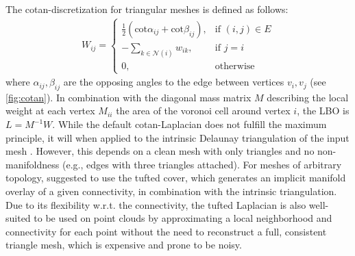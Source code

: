 The cotan-discretization \cite{pinkallporthier} for triangular meshes is defined as follows:
\begin{align}
    W_{ij} = \begin{cases}
        \frac{1}{2} (\text{cot}\alpha_{ij} + \text{cot} \beta_{ij}), & \text{if } (i,j) \in E \\
        - \sum_{k \in \mathcal{N}(i)} w_{ik}, & \text{if } j=i \\
        0, & \text{otherwise}
    \end{cases}
\end{align}
where $\alpha_{ij}, \beta_{ij}$ are the opposing angles to the edge between vertices $v_i, v_j$ (see \cref{fig:cotan}). 
In combination with the diagonal mass matrix $M$ describing the local weight at each vertex $M_{ii}$ the area of the voronoi cell around vertex $i$, the LBO is $L = M^{-1} W$.
While the default cotan-Laplacian does not fulfill the maximum principle, it will when applied to the intrinsic Delaunay triangulation of the input mesh \cite{bobenko2007simplicial}.
However, this depends on a clean mesh with only triangles and no non-manifoldness (e.g., edges with three triangles attached). 
For meshes of arbitrary topology, \cite{sharp2020nonmanifold} suggested to use the tufted cover, which generates an implicit manifold overlay of a given connectivity, in combination with the intrinsic triangulation. 
Due to its flexibility w.r.t. the connectivity, the tufted Laplacian is also well-suited to be used on point clouds by approximating a local neighborhood and connectivity for each point without the need to reconstruct a full, consistent triangle mesh, which is expensive and prone to be noisy. 
